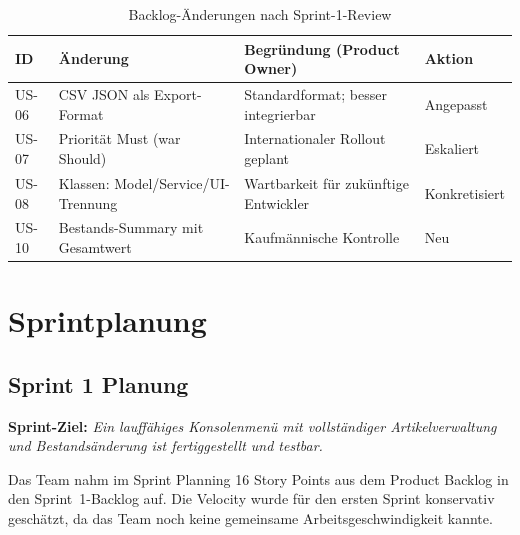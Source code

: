 \documentclass[12pt, a4paper, twoside]{report}
\begin{document}
\begin{table}[H]
  \centering
  \caption{Backlog-Änderungen nach Sprint-1-Review}
  \label{tab:backlog-changes}
  \begin{tabularx}{\textwidth}{C{0.7cm} L{5.5cm} L{4.5cm} C{1.8cm}}
    \toprule
    \textbf{ID} & \textbf{Änderung} & \textbf{Begründung (Product Owner)} & \textbf{Aktion} \\
    \midrule
    US-06 & CSV \textrightarrow{} JSON als Export-Format & Standardformat; besser integrierbar & Angepasst \\
    US-07 & Priorität Must (war Should) & Internationaler Rollout geplant & Eskaliert \\
    US-08 & Klassen: Model/Service/UI-Trennung & Wartbarkeit für zukünftige Entwickler & Konkretisiert \\
    US-10 & Bestands-Summary mit Gesamtwert & Kaufmännische Kontrolle & Neu \\
    \bottomrule
  \end{tabularx}
\end{table}

\chapter{Sprintplanung}
\label{chap:sprintplanung}

\section{Sprint 1 \textendash{} Planung}

\textbf{Sprint-Ziel:} \textit{Ein lauffähiges Konsolenmenü mit vollständiger Artikelverwaltung
und Bestandsänderung ist fertiggestellt und testbar.}

Das Team nahm im Sprint Planning 16 Story Points aus dem Product Backlog in den Sprint~1-Backlog
auf. Die Velocity wurde für den ersten Sprint konservativ geschätzt, da das Team noch keine
gemeinsame Arbeitsgeschwindigkeit kannte.
\end{document}

